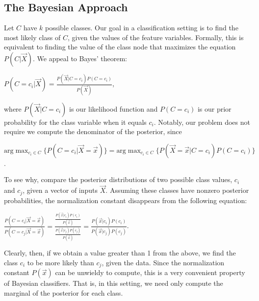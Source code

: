 \documentclass[12pt,twoside]{reedthesis}
\begin{document}
	\subsection*{The Bayesian Approach}
	Let $C$ have $k$ possible classes. 
	Our goal in a classification setting is to find the most likely class of $C$, given the values of the feature variables. Formally, this is equivalent to finding the value of the class node that maximizes the equation $P(C | \vec{X})$. We appeal to Bayes' theorem:
	\begin{center}
		$P(C = c_i | \vec{X}) = \displaystyle\frac{P(\vec{X} | C = c_i) P(C = c_i)}{P(\vec{X})}$,
	\end{center}
	where $P(\vec{X} | C = c_i)$ is our likelihood function and $P(C = c_i)$ is our prior probability for the class variable when it equals $c_i$. Notably, our problem does not require we compute the denominator of the posterior, since
	\begin{center} 
	$\displaystyle\textrm{arg}\max_{c_i \in C}{\{ P(C=c_i | \vec{X} = \vec{x}) \}} = \displaystyle\textrm{arg}\max_{c_i \in C}\{ P(\vec{X} = \vec{x} | C = c_i) P(C=c_i) \}$.
	\end{center}
	To see why, compare the posterior distributions of two possible class values, $c_i$ and $c_j$, given a vector of inputs $\vec{X}$. Assuming these classes have nonzero posterior probabilities, the normalization constant disappears from the following equation:
	\begin{center}
		$\displaystyle\frac{P(C=c_i | \vec{X} = \vec{x})}{P(C=c_j | \vec{X} = \vec{x})} = 
		\displaystyle\frac{\displaystyle\frac{P(\vec{x} | c_i)P( c_i)}{P(\vec{x})}}{\displaystyle\frac{P(\vec{x} | c_j) P( c_j)}{P(\vec{x})}} = \frac{P(\vec{x} | c_i) P( c_i)}{P(\vec{x} | c_j) P( c_j)}$.
	\end{center}
	Clearly, then, if we obtain a value greater than 1 from the above, we find the class $c_i$ to be more likely than $c_j$, given the data. Since the normalization constant $P(\vec{x})$ can be unwieldy to compute, this is a very convenient property of Bayesian classifiers. That is, in this setting, we need only compute the marginal of the posterior for each class.
\end{document}
